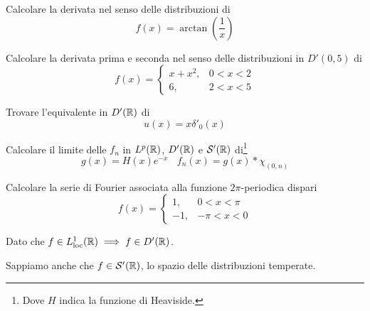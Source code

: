 Calcolare la derivata nel senso delle distribuzioni di
\begin{equation*}
f(x)=\arctan\left(\frac{1}{x}\right)
\end{equation*}
\Esercizio{}

Calcolare la derivata prima e seconda nel senso delle distribuzioni in $D'( 0,5)$ di
\begin{equation*}
f(x)=\begin{cases}
x+x^{2} , & 0< x< 2\\
6, & 2< x< 5
\end{cases}
\end{equation*}
\Esercizio{}

Trovare l'equivalente in $D'(\mathbb{R}  )$ di
\begin{equation*}
u(x)=x\delta '_{0} (x)
\end{equation*}
\Esercizio{}

Calcolare il limite delle $f_{n}$ in $L^{p} (\mathbb{R}  )$, $D'(\mathbb{R}  )$ e $\mathcal{S}  '(\mathbb{R}  )$ di\footnote{Dove $H$ indica la funzione di Heaviside.}
\begin{equation*}
g(x)=H(x)e^{-x} \ \ \ \ f_{n} (x)=g(x)*\chi _{(0,n)}
\end{equation*}
\Esercizio{}

Calcolare la serie di Fourier associata alla funzione $2\pi $-periodica dispari
\begin{equation*}
f(x)=\begin{cases}
1, & 0< x< \pi \\
-1, & -\pi < x< 0
\end{cases}
\end{equation*}
\ParteSoluzioni
\Soluzione

Dato che $f\in L^{1}_{\operatorname{loc}} (\mathbb{R}  )\implies f\in D'(\mathbb{R}  )$.

Sappiamo anche che $f\in \mathcal{S}  '(\mathbb{R} )$, lo spazio delle distribuzioni temperate.


